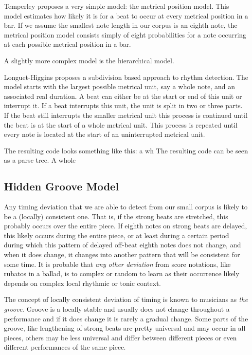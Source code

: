 \documentclass[a4paper,10pt]{article}
\begin{document}
Temperley proposes a very simple model: the metrical position model. This model estimates how likely it is for a beat to occur at every metrical position in a bar. If we assume the smallest note length in our corpus is an eighth note, the metrical position model consists simply of eight probabilities for a note occurring at each possible metrical position in a bar.

A slightly more complex model is the hierarchical model.

Longuet-Higgins proposes a subdivision based approach to rhythm detection. The model starts with the largest possible metrical unit, say a whole note, and an associated real duration. A beat can either be at the start or end of this unit or interrupt it. If a beat interrupts this unit, the unit is split in two or three parts. If the beat still interrupts the smaller metrical unit this process is continued until the beat is at the start of a whole metrical unit. This process is repeated until every note is located at the start of an uninterrupted metrical unit.

The resulting code looks something like this: a wh
The resulting code can be seen as a parse tree. A whole 





\subsection{Hidden Groove Model}
Any timing deviation that we are able to detect from our small corpus is likely to be a (locally) consistent one. That is, if the strong beats are stretched, this probably occurs over the entire piece. If eighth notes on strong beats are delayed, this likely occurs during the entire piece, or at least during a certain period during which this pattern of delayed off-beat eighth notes does not change, and when it does change, it changes into another pattern that will be consistent for some time. It is probable that \emph{any other deviation} from score notations, like rubatos in a ballad, is to complex or random to learn as their occurrence likely depends on complex local rhythmic or tonic context. 

The concept of locally consistent deviation of timing is known to musicians as \textit{the groove}. Groove is a locally stable and usually does not change throughout a performance and if it does change it is rarely a gradual change. Some parts of the groove, like lengthening of strong beats are pretty universal and may occur in all pieces, others may be less universal and differ between different pieces or even different performances of the same piece.
\end{document}
